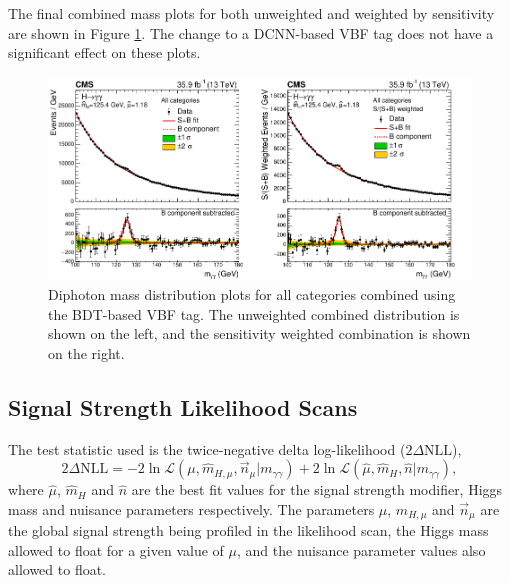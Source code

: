 The final combined mass plots for both unweighted and weighted by sensitivity are shown in Figure \ref{fig:stats_results:comb_mass_plots}. The change to a DCNN-based VBF tag does not have a significant effect on these plots.
\begin{figure}[h!]
    \begin{center}
        \includegraphics[width=1.0\textwidth]{figures/stats_results/CMS-HIG-16-040_Figure_014.pdf}
    \end{center}
    \caption{Diphoton mass distribution plots for all categories combined using the BDT-based VBF tag.
            The unweighted combined distribution is shown on the left, and the sensitivity weighted combination is shown on the right.}
        \label{fig:stats_results:comb_mass_plots}
\end{figure}








\subsection{Signal Strength Likelihood Scans}
The test statistic used is the twice-negative delta log-likelihood ($2\Delta{\mathrm{NLL}}$), 
\begin{equation}
    2\Delta{\mathrm{NLL}} = -2\ln{\mathcal{L}}(\mu,\hat{m}_{H,\mu},\vec{n}_{\mu} | m_{\gamma\gamma}) + 2\ln\mathcal{L}(\hat{\mu},\hat{m}_{H},\hat{n} | m_{\gamma\gamma}),
\end{equation}
where $\hat{\mu}$, $\hat{m}_{H}$ and $\hat{n}$ are the best fit values for the signal strength modifier, Higgs mass and nuisance parameters respectively. 
The parameters $\mu$, $\hat{m}_{H,\mu}$ and $\vec{n}_{\mu}$ are the global signal strength being profiled in the likelihood scan, the Higgs mass allowed to float for a given value of $\mu$, and the nuisance parameter values also allowed to float. 

